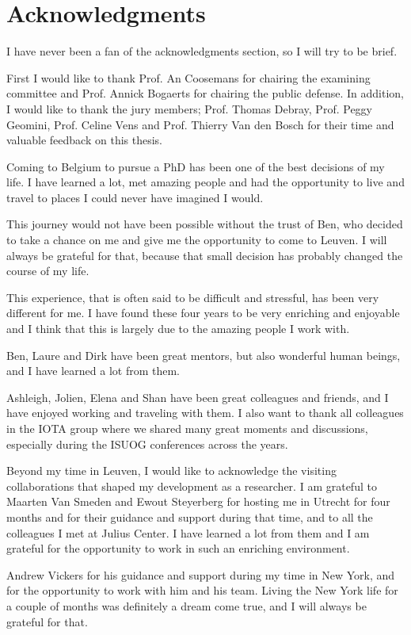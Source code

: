 \chapter*{Acknowledgments}

I have never been a fan of the acknowledgments section, so I will try to be brief.

First I would like to thank Prof. An Coosemans for chairing the examining committee and Prof. Annick Bogaerts for chairing the public defense. In addition, I would like to thank the jury members; Prof. Thomas Debray, Prof. Peggy Geomini, Prof. Celine Vens and Prof. Thierry Van den Bosch for their time and valuable feedback on this thesis.

Coming to Belgium to pursue a PhD has been one of the best decisions of my life. I have learned a lot, met amazing people and had the opportunity to live and travel to places I could never have imagined I would. 

This journey would not have been possible without the trust of Ben, who decided to take a chance on me and give me the opportunity to come to Leuven. I will always be grateful for that, because that small decision has probably changed the course of my life. 

This experience, that is often said to be difficult and stressful, has been very different for me. I have found these four years to be very enriching and enjoyable and I think that this is largely due to the amazing people I work with. 

Ben, Laure and Dirk have been great mentors, but also wonderful human beings, and I have learned a lot from them. 

Ashleigh, Jolien, Elena and Shan have been great colleagues and friends, and I have enjoyed working and traveling with them. I also want to thank all colleagues in the IOTA group where we shared many great moments and discussions, especially during the ISUOG conferences across the years. 

Beyond my time in Leuven, I would like to acknowledge the visiting collaborations that shaped my development as a researcher. I am grateful to Maarten Van Smeden and Ewout Steyerberg for hosting me in Utrecht for four months and for their guidance and support during that time, and to all the colleagues I met at Julius Center. I have learned a lot from them and I am grateful for the opportunity to work in such an enriching environment.

Andrew Vickers for his guidance and support during my time in New York, and for the opportunity to work with him and his team. Living the New York life for a couple of months was definitely a dream come true, and I will always be grateful for that.


